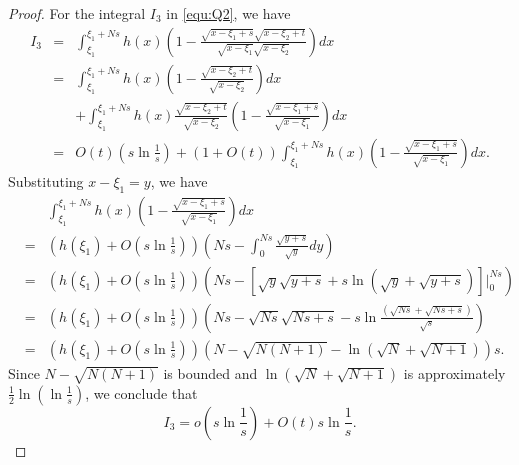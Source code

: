 \documentclass[10pt,a4paper]{amsart}
\begin{document}
\begin{proof}
For the integral $I_3$ in \eqref{equ:Q2}, we have 
\begin{eqnarray*}
  I_3 &=& \int_{\xi_1}^{\xi_1+Ns} h(x)\left(1-\frac{\sqrt{x-\xi_1+s}\sqrt{x-\xi_2+t}}{\sqrt{x-\xi_1}\sqrt{x-\xi_2}}\right)dx
   \\
   &=& \int_{\xi_1}^{\xi_1+Ns} h(x) \left(1-\frac{\sqrt{x-\xi_2+t}}{\sqrt{x-\xi_2}}\right)dx \\
   && +\int_{\xi_1}^{\xi_1+Ns} h(x)\frac{\sqrt{x-\xi_2+t}}{\sqrt{x-\xi_2}}\left(1-\frac{\sqrt{x-\xi_1+s}}{\sqrt{x-\xi_1}}\right)dx \\
   &=& O(t) \left( s \ln \frac{1}{s}\right) + \left(1+O(t)\right)\int_{\xi_1}^{\xi_1+Ns} h(x)\left(1-\frac{\sqrt{x-\xi_1+s}}{\sqrt{x-\xi_1}}\right)dx.
\end{eqnarray*}
Substituting $x-\xi_1=y$, we have 
\begin{eqnarray*}
&& \int_{\xi_1}^{\xi_1+Ns}h(x) \left(1-\frac{\sqrt{x-\xi_1+s}}{\sqrt{x-\xi_1}}\right)dx \\
&=& \left( h(\xi_1)+O\left(s\ln\frac{1}{s}\right) \right) \left( Ns-\int_0^{Ns}\frac{\sqrt{y+s}}{\sqrt{y}}dy \right)\\
&=& \left( h(\xi_1)+O\left(s\ln\frac{1}{s}\right) \right) \left( Ns-\left[\sqrt{y}\sqrt{y+s}+s\ln(\sqrt{y}+\sqrt{y+s})\right]|_0^{Ns} \right)\\
&=&  \left( h(\xi_1)+O\left(s\ln\frac{1}{s}\right) \right) \left( Ns-\sqrt{Ns}\sqrt{Ns+s}-s\ln\frac{(\sqrt{Ns}+\sqrt{Ns+s})}{\sqrt{s}} \right)\\
&=& \left( h(\xi_1)+O\left(s\ln\frac{1}{s}\right) \right) \left(N-\sqrt{N(N+1)}-\ln(\sqrt{N}+\sqrt{N+1})\right)s.
\end{eqnarray*}
Since $N-\sqrt{N(N+1)}$ is bounded and $\ln(\sqrt{N}+\sqrt{N+1})$ is approximately 
$\frac{1}{2} \ln \left(\ln \frac{1}{s}\right)$,
we conclude that  $$I_3= o\left(s \ln \frac{1}{s}\right)+ O(t) s \ln \frac{1}{s}.$$ 




\end{proof}
\end{document}
